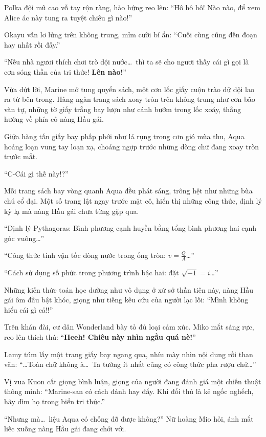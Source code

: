 \documentclass[../main.tex]{subfiles}
\begin{document}
Polka đội mũ cao vỗ tay rộn ràng, hào hứng reo lên: ``Hô hô hô! Nào nào, để xem Alice ác này tung ra tuyệt chiêu gì nào!''

Okayu vẫn lơ lửng trên không trung, mỉm cười bí ẩn: ``Cuối cùng cũng đến đoạn hay nhất rồi đấy.''

``Nếu nhà ngươi thích chơi trò dội nước\dots\ thì ta sẽ cho ngươi thấy cái gì gọi là cơn sóng thần của tri thức! \textbf{Lên nào!}''

Vừa dứt lời, Marine mở tung quyển sách, một cơn lốc giấy cuộn trào dữ dội lao ra từ bên trong. Hàng ngàn trang sách xoay tròn trên không trung như cơn bão văn tự, những tờ giấy trắng bay lượn như cánh bướm trong lốc xoáy, thẳng hướng về phía cô nàng Hầu gái.

Giữa hàng tấn giấy bay phấp phới như lá rụng trong cơn gió mùa thu, Aqua hoảng loạn vung tay loạn xạ, choáng ngợp trước những dòng chữ đang xoay tròn trước mắt.

``C-Cái gì thế này!?''

Mỗi trang sách bay vòng quanh Aqua đều phát sáng, trông hệt như những bùa chú cổ đại. Một số trang lật ngay trước mặt cô, hiển thị những công thức, định lý kỳ lạ mà nàng Hầu gái chưa từng gặp qua.

``Định lý Pythagoras: Bình phương cạnh huyền bằng tổng bình phương hai cạnh góc vuông\dots''

``Công thức tính vận tốc dòng nước trong ống tròn: \(v = \frac{Q}{A}\)\dots''

``Cách sử dụng số phức trong phương trình bậc hai: đặt \(\sqrt{-1} = i \)\dots''

Những kiến thức toán học dường như vô dụng ở xứ sở thần tiên này, nàng Hầu gái ôm đầu bật khóc, giọng như tiếng kêu cứu của người lạc lối: ``Mình không hiểu cái gì cả!!''

Trên khán đài, cư dân Wonderland bày tỏ đủ loại cảm xúc. Miko mắt sáng rực, reo lên thích thú: ``\textbf{Heeh! Chiêu này nhìn ngầu quá nè!}''

Lamy túm lấy một trang giấy bay ngang qua, nhíu mày nhìn nội dung rồi than vãn: ``\dots Toàn chữ không à\dots\ Ta tưởng ít nhất cũng có công thức pha rượu chứ\dots''

Vị vua Kuon cất giọng bình luận, giọng của người đang đánh giá một chiến thuật thông minh: ``Marine-san có cách đánh hay đấy. Khi đối thủ là kẻ ngốc nghếch, hãy dìm họ trong biển tri thức.''

``Nhưng mà\dots\ liệu Aqua có chống đỡ được không?'' Nữ hoàng Mio hỏi, ánh mắt liếc xuống nàng Hầu gái đang chới với.
\end{document}
